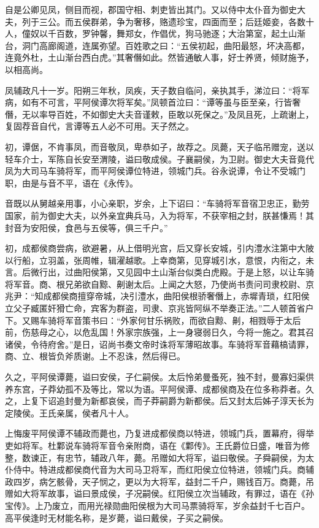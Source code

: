 \documentclass[12pt,UTF8]{ctexbook}
\begin{document}
自是公卿见凤，侧目而视，郡国守相、刺吏皆出其门。又以侍中太仆音为御史大夫，列于三公。而五侯群弟，争为奢移，赂遗珍宝，四面而至；后廷姬妾，各数十人，僮奴以千百数，罗钟馨，舞郑女，作倡优，狗马驰逐；大治第室，起土山渐台，洞门高廊阁道，连属弥望。百姓歌之曰：“五侯初起，曲阳最怒，坏决高都，连竟外杜，土山渐台西白虎。”其奢僭如此。然皆通敏人事，好士养贤，倾财施予，以相高尚。



凤辅政凡十一岁。阳朔三年秋，凤疾，天子数自临问，亲执其手，涕泣曰：“将军病，如有不可言，平阿侯谭次将军矣。”凤顿首泣曰：“谭等虽与臣至亲，行皆奢僭，无以率导百姓，不如御史大夫音谨敕，臣敢以死保之。”及凤且死，上疏谢上，复固荐音自代，言谭等五人必不可用。天子然之。



初，谭倨，不肯事凤，而音敬凤，卑恭如子，故荐之。凤薨，天子临吊赠宠，送以轻车介士，军陈自长安至渭陵，谥曰敬成侯。子襄嗣侯，为卫尉。御史大夫音竟代凤为大司马车骑将军，而平阿侯谭位特进，领城门兵。谷永说谭，令让不受城门职，由是与音不平，语在《永传》。



音既以从舅越亲用事，小心亲职，岁余，上下诏曰：“车骑将军音宿卫忠正，勤劳国家，前为御史大夫，以外亲宜典兵马，入为将军，不获宰相之封，朕甚慊焉！其封音为安阳侯，食邑与五侯等，俱三千户。”



初，成都侯商尝病，欲避暑，从上借明光宫，后又穿长安城，引内澧水注第中大陂以行船，立羽盖，张周帷，辑濯越歌。上幸商第，见穿城引水，意恨，内衔之，未言。后微行出，过曲阳侯第，又见园中土山渐台似类白虎殿。于是上怒，以让车骑将军音。商、根兄弟欲自黥、劓谢太后。上闻之大怒，乃使尚书责问司隶校尉、京兆尹：“知成都侯商擅穿帝城，决引澧水，曲阳侯根骄奢僭上，赤墀青琐，红阳侯立父子臧匿奸猾亡命，宾客为群盗，司隶、京兆皆阿纵不举奏正法。”二人顿首省户下。又赐车骑将军音策书曰：“外家何甘乐祸败，而欲自黥、劓，相戮辱于太后前，伤慈母之心，以危乱国！外家宗族强，上一身寝弱日久，今将一施之。君其召诸侯，令待府舍。”是日，诏尚书奏文帝时诛将军薄昭故事。车骑将军音藉槁请罪，商、立、根皆负斧质谢。上不忍诛，然后得已。



久之，平阿侯谭薨，谥曰安侯，子仁嗣侯。太后怜弟曼蚤死，独不封，曼寡妇渠供养东宫，子莽幼孤不及等比，常以为语。平阿侯谭、成都侯商及在位多称莽者。久之，上复下诏追封曼为新都哀侯，而子莽嗣爵为新都侯。后又封太后姊子淳天长为定陵侯。王氏亲属，侯者凡十人。



上悔废平阿侯谭不辅政而薨也，乃复进成都侯商以特进，领城门兵，置幕府，得举吏如将军。杜鄴说车骑将军音令亲附商，语在《鄴传》。王氏爵位日盛，唯音为修整，数谏正，有忠节，辅政八年，薨。吊赠如大将军，谥曰敬侯。子舜嗣侯，为太仆侍中。特进成都侯商代音为大司马卫将军，而红阳侯立位特进，领城门兵。商辅政四岁，病乞骸骨，天子悯之，更以为大将军，益封二千户，赐钱百万。商薨，吊赠如大将军故事，谥曰景成侯，子况嗣侯。红阳侯立次当辅政，有罪过，语在《孙宝传》。上乃废立，而用光禄勋曲阳侯根为大司马票骑将军，岁余益封千七百户。高平侯逢时无材能名称，是岁薨，谥曰戴侯，子买之嗣侯。
\end{document}
